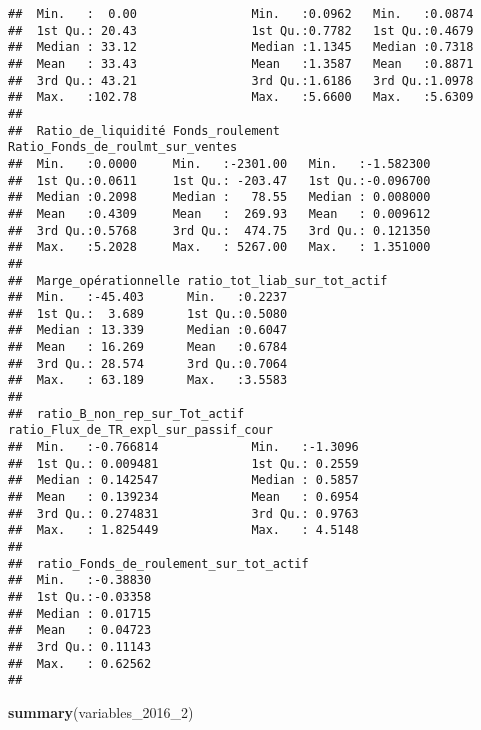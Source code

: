 \documentclass[
]{article}
\newenvironment{Shaded}{\begin{snugshade}}{\end{snugshade}}
\newcommand{\DecValTok}[1]{\textcolor[rgb]{0.00,0.00,0.81}{#1}}
\newcommand{\KeywordTok}[1]{\textcolor[rgb]{0.13,0.29,0.53}{\textbf{#1}}}
\newcommand{\NormalTok}[1]{#1}
\begin{document}
\begin{verbatim}
##  Min.   :  0.00                Min.   :0.0962   Min.   :0.0874         
##  1st Qu.: 20.43                1st Qu.:0.7782   1st Qu.:0.4679         
##  Median : 33.12                Median :1.1345   Median :0.7318         
##  Mean   : 33.43                Mean   :1.3587   Mean   :0.8871         
##  3rd Qu.: 43.21                3rd Qu.:1.6186   3rd Qu.:1.0978         
##  Max.   :102.78                Max.   :5.6600   Max.   :5.6309         
##                                                                        
##  Ratio_de_liquidité Fonds_roulement    Ratio_Fonds_de_roulmt_sur_ventes
##  Min.   :0.0000     Min.   :-2301.00   Min.   :-1.582300               
##  1st Qu.:0.0611     1st Qu.: -203.47   1st Qu.:-0.096700               
##  Median :0.2098     Median :   78.55   Median : 0.008000               
##  Mean   :0.4309     Mean   :  269.93   Mean   : 0.009612               
##  3rd Qu.:0.5768     3rd Qu.:  474.75   3rd Qu.: 0.121350               
##  Max.   :5.2028     Max.   : 5267.00   Max.   : 1.351000               
##                                                                        
##  Marge_opérationnelle ratio_tot_liab_sur_tot_actif
##  Min.   :-45.403      Min.   :0.2237              
##  1st Qu.:  3.689      1st Qu.:0.5080              
##  Median : 13.339      Median :0.6047              
##  Mean   : 16.269      Mean   :0.6784              
##  3rd Qu.: 28.574      3rd Qu.:0.7064              
##  Max.   : 63.189      Max.   :3.5583              
##                                                   
##  ratio_B_non_rep_sur_Tot_actif ratio_Flux_de_TR_expl_sur_passif_cour
##  Min.   :-0.766814             Min.   :-1.3096                      
##  1st Qu.: 0.009481             1st Qu.: 0.2559                      
##  Median : 0.142547             Median : 0.5857                      
##  Mean   : 0.139234             Mean   : 0.6954                      
##  3rd Qu.: 0.274831             3rd Qu.: 0.9763                      
##  Max.   : 1.825449             Max.   : 4.5148                      
##                                                                     
##  ratio_Fonds_de_roulement_sur_tot_actif
##  Min.   :-0.38830                      
##  1st Qu.:-0.03358                      
##  Median : 0.01715                      
##  Mean   : 0.04723                      
##  3rd Qu.: 0.11143                      
##  Max.   : 0.62562                      
## 
\end{verbatim}

\begin{Shaded}
\begin{Highlighting}[]
\KeywordTok{summary}\NormalTok{(variables_}\DecValTok{2016}\NormalTok{_}\DecValTok{2}\NormalTok{)}
\end{Highlighting}
\end{Shaded}
\end{document}
